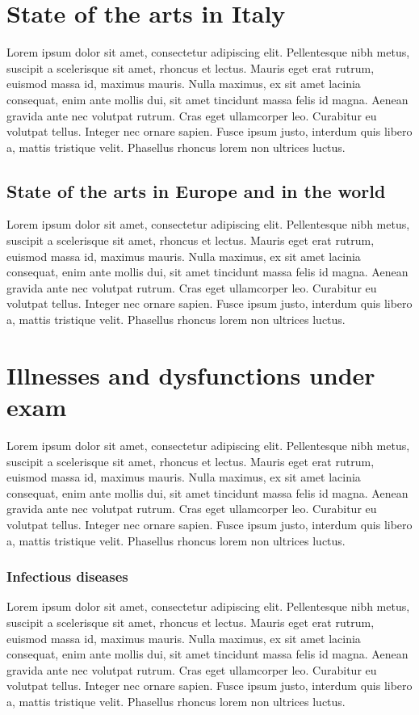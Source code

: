 \section{State of the arts in Italy}\label{subsec:stateoftheartsinitaly}
Lorem ipsum dolor sit amet, consectetur adipiscing elit. Pellentesque nibh metus, suscipit a scelerisque sit amet, rhoncus et lectus. Mauris eget erat rutrum, euismod massa id, maximus mauris. Nulla maximus, ex sit amet lacinia consequat, enim ante mollis dui, sit amet tincidunt massa felis id magna. Aenean gravida ante nec volutpat rutrum. Cras eget ullamcorper leo. Curabitur eu volutpat tellus. Integer nec ornare sapien. Fusce ipsum justo, interdum quis libero a, mattis tristique velit. Phasellus rhoncus lorem non ultrices luctus.

\subsection{State of the arts in Europe and in the world}\label{subsec:stateoftheartsineurope}
Lorem ipsum dolor sit amet, consectetur adipiscing elit. Pellentesque nibh metus, suscipit a scelerisque sit amet, rhoncus et lectus. Mauris eget erat rutrum, euismod massa id, maximus mauris. Nulla maximus, ex sit amet lacinia consequat, enim ante mollis dui, sit amet tincidunt massa felis id magna. Aenean gravida ante nec volutpat rutrum. Cras eget ullamcorper leo. Curabitur eu volutpat tellus. Integer nec ornare sapien. Fusce ipsum justo, interdum quis libero a, mattis tristique velit. Phasellus rhoncus lorem non ultrices luctus.

\section{Illnesses and dysfunctions under exam}\label{sec:illnessesanddysfunctions}
Lorem ipsum dolor sit amet, consectetur adipiscing elit. Pellentesque nibh metus, suscipit a scelerisque sit amet, rhoncus et lectus. Mauris eget erat rutrum, euismod massa id, maximus mauris. Nulla maximus, ex sit amet lacinia consequat, enim ante mollis dui, sit amet tincidunt massa felis id magna. Aenean gravida ante nec volutpat rutrum. Cras eget ullamcorper leo. Curabitur eu volutpat tellus. Integer nec ornare sapien. Fusce ipsum justo, interdum quis libero a, mattis tristique velit. Phasellus rhoncus lorem non ultrices luctus.


\subsubsection{Infectious diseases}\label{sub:infectiousdiseases}
Lorem ipsum dolor sit amet, consectetur adipiscing elit. Pellentesque nibh metus, suscipit a scelerisque sit amet, rhoncus et lectus. Mauris eget erat rutrum, euismod massa id, maximus mauris. Nulla maximus, ex sit amet lacinia consequat, enim ante mollis dui, sit amet tincidunt massa felis id magna. Aenean gravida ante nec volutpat rutrum. Cras eget ullamcorper leo. Curabitur eu volutpat tellus. Integer nec ornare sapien. Fusce ipsum justo, interdum quis libero a, mattis tristique velit. Phasellus rhoncus lorem non ultrices luctus.

